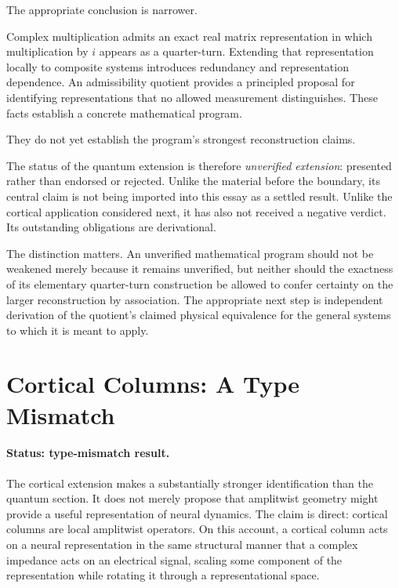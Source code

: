 \documentclass[11pt]{article}
\begin{document}
The appropriate conclusion is narrower.

Complex multiplication admits an exact real matrix representation in which multiplication by $i$ appears as a quarter-turn. Extending that representation locally to composite systems introduces redundancy and representation dependence. An admissibility quotient provides a principled proposal for identifying representations that no allowed measurement distinguishes. These facts establish a concrete mathematical program.

They do not yet establish the program's strongest reconstruction claims.

The status of the quantum extension is therefore \emph{unverified extension}: presented rather than endorsed or rejected. Unlike the material before the boundary, its central claim is not being imported into this essay as a settled result. Unlike the cortical application considered next, it has also not received a negative verdict. Its outstanding obligations are derivational.

The distinction matters. An unverified mathematical program should not be weakened merely because it remains unverified, but neither should the exactness of its elementary quarter-turn construction be allowed to confer certainty on the larger reconstruction by association. The appropriate next step is independent derivation of the quotient's claimed physical equivalence for the general systems to which it is meant to apply.

\section{Cortical Columns: A Type Mismatch}

\paragraph{Status: type-mismatch result.}

The cortical extension \citep{FlyxionCortical} makes a substantially stronger identification than the quantum section. It does not merely propose that amplitwist geometry might provide a useful representation of neural dynamics. The claim is direct: cortical columns are local amplitwist operators. On this account, a cortical column acts on a neural representation in the same structural manner that a complex impedance acts on an electrical signal, scaling some component of the representation while rotating it through a representational space.
\end{document}
